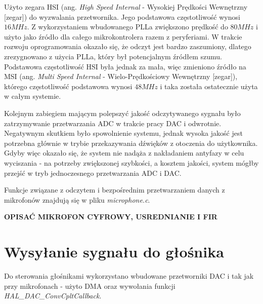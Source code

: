 Użyto zegara HSI (ang. \textit{High Speed Internal} - Wysokiej Prędkości Wewnętrzny [zegar]) do wyzwalania przetwornika. Jego podstawowa częstotliwość wynosi $16MHz$. Z wykorzystaniem wbudowanego PLLa zwiększono prędkość do $80MHz$ i użyto jako źródło dla całego mikrokontrolera razem z peryferiami. W trakcie rozwoju oprogramowania okazało się, że odczyt jest bardzo zaszumiony, dlatego zrezygnowano z użycia PLLa, który był potencjalnym źródłem szumu. Podstawowa częstotliwość HSI była jednak za mała, więc zmieniono źródło na MSI (ang. \textit{Multi Speed Internal} - Wielo-Prędkościowy Wewnętrzny [zegar]), którego częstotliwość podstawowa wynosi $48MHz$ i taka została ostatecznie użyta w całym systemie.

Kolejnym zabiegiem mającym polepszyć jakość odczytywanego sygnału było zatrzymywanie przetwarzania ADC w trakcie pracy DAC i odwrotnie. Negatywnym skutkiem było spowolnienie systemu, jednak wysoka jakość jest potrzebna głównie w trybie przekazywania dźwięków z otoczenia do użytkownika. Gdyby więc okazało się, że system nie nadąża z nakładaniem antyfazy w celu wyciszania - na potrzeby zwiększonej szybkości, a kosztem jakości, system mógłby przejść w tryb jednoczesnego przetwarzania ADC i DAC.

Funkcje związane z odczytem i bezpośrednim przetwarzaniem danych z mikrofonów znajdują się w pliku \textit{microphone.c}.

\textbf{OPISAĆ MIKROFON CYFROWY, USREDNIANIE I FIR}

\section{Wysyłanie sygnału do głośnika}
\label{cha:soft_spkr}

Do sterowania głośnikami wykorzystano wbudowane przetworniki DAC i tak jak przy mikrofonach - użyto DMA oraz wywołania funkcji \textit{HAL\_DAC\_ConvCpltCallback}. 